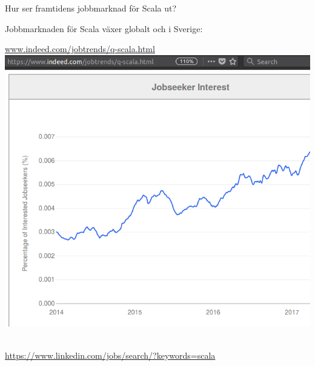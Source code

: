 \begin{Slide}{Hur ser framtidens jobbmarknad för Scala ut?}\SlideFontTiny

\hspace{-2.5em}\begin{minipage}{1.0\textwidth}
Jobbmarknaden för Scala växer globalt och i Sverige:

\begin{minipage}{0.48\textwidth}
\href{www.indeed.com/jobtrends/q-scala.html}{www.indeed.com/jobtrends/q-scala.html}\\
\vspace{1em}
\includegraphics[width=1.0\textwidth]{../img/w14/scala-jobs-indeed-2017.png}~~
\end{minipage}
\hfill\begin{minipage}{0.48\textwidth}
\vspace{1.25em}
\href{https://www.linkedin.com/jobs/search/?keywords=scala&location=Sweden&locationId=se%3A0}{https://www.linkedin.com/jobs/search/?keywords=scala}\\

\end{minipage}
\end{minipage}
\end{Slide}
